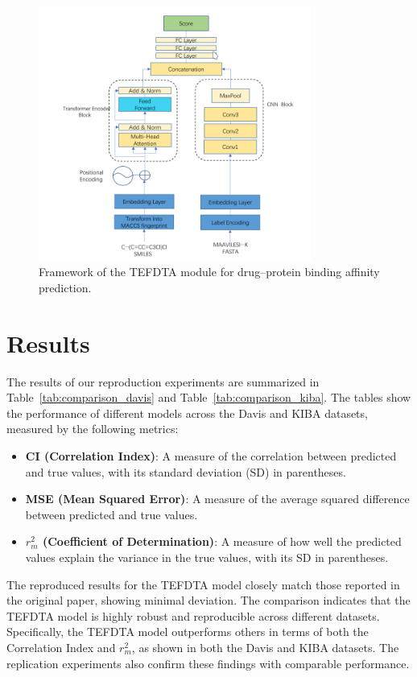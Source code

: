 \documentclass{article}
\begin{document}
\begin{figure}[H]
	\centering
	\includegraphics[width=0.8\textwidth]{images/TEFDTA_Framework.png}
	\caption{Framework of the TEFDTA module for drug–protein binding affinity prediction.}
	\label{fig:tefdta_framework}
\end{figure}


\section{Results}

The results of our reproduction experiments are summarized in Table~\ref{tab:comparison_davis} and Table~\ref{tab:comparison_kiba}. The tables show the performance of different models across the Davis and KIBA datasets, measured by the following metrics:
\begin{itemize}
	\item \textbf{CI (Correlation Index)}: A measure of the correlation between predicted and true values, with its standard deviation (SD) in parentheses.
	\item \textbf{MSE (Mean Squared Error)}: A measure of the average squared difference between predicted and true values.
	\item \textbf{$r_m^2$ (Coefficient of Determination)}: A measure of how well the predicted values explain the variance in the true values, with its SD in parentheses.
\end{itemize}

The reproduced results for the TEFDTA model closely match those reported in the original paper, showing minimal deviation. The comparison indicates that the TEFDTA model is highly robust and reproducible across different datasets. Specifically, the TEFDTA model outperforms others in terms of both the Correlation Index and $r_m^2$, as shown in both the Davis and KIBA datasets. The replication experiments also confirm these findings with comparable performance.
\end{document}
